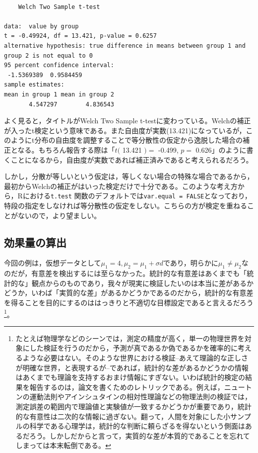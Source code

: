 \documentclass[
  a4paper,
]{ltjsbook}
\begin{document}
\begin{verbatim}

    Welch Two Sample t-test

data:  value by group
t = -0.49924, df = 13.421, p-value = 0.6257
alternative hypothesis: true difference in means between group 1 and group 2 is not equal to 0
95 percent confidence interval:
 -1.5369389  0.9584459
sample estimates:
mean in group 1 mean in group 2 
       4.547297        4.836543 
\end{verbatim}

よく見ると，タイトルがWelch Two Sample
t-testに変わっている。Welchの補正が入ったt検定という意味である。また自由度が実数(13.421)になっているが，このようにt分布の自由度を調整することで等分散性の仮定から逸脱した場合の補正となる。もちろん報告する際は「\(t(\)
13.421 \()=\) -0.499, \(p=\)
0.626」のように書くことになるから，自由度が実数であれば補正済みであると考えられるだろう。

しかし，分散が等しいという仮定は，等しくない場合の特殊な場合であるから，最初からWelchの補正がはいった検定だけで十分である。このような考え方から，Rにおける\texttt{t.test}
関数のデフォルトでは\texttt{var.equal\ =\ FALSE}となっており，特段の指定をしなければ等分散性の仮定をしない。こちらの方が検定を重ねることがないので，より望ましい。

\subsection{効果量の算出}\label{ux52b9ux679cux91cfux306eux7b97ux51fa}

今回の例は，仮想データとして\(\mu_1 = 4,\mu_2 = \mu_1 + \sigma d\)であり，明らかに\(\mu_1 \neq \mu_2\)なのだが，有意差を検出するには至らなかった。統計的な有意差はあくまでも「統計的な」観点からのものであり，我々が現実に検証したいのは本当に差があるかどうか，いわば「実質的な差」があるかどうかであるのだから，統計的な有意差を得ることを目的にするのははっきりと不適切な目標設定であると言えるだろう\footnote{たとえば物理学などのシーンでは，測定の精度が高く，単一の物理世界を対象にした検証を行うのだから，予測が真であるか偽であるかを確率的に考えるような必要はない。そのような世界における検証--あえて理論的な正しさが明確な世界，と表現するが--であれば，統計的な差があるかどうかの情報はあくまでも理論を支持するおまけ情報にすぎない。いわば統計的検定の結果を報告するのは，論文を書くためのレトリックである。例えば，ニュートンの運動法則やアインシュタインの相対性理論などの物理法則の検証では，測定誤差の範囲内で理論値と実験値が一致するかどうかが重要であり，統計的な有意性は二次的な情報に過ぎない。翻って，人間を対象にした小サンプルの科学である心理学は，統計的な判断に頼らざるを得ないという側面はあるだろう。しかしだからと言って，実質的な差が本質的であることを忘れてしまっては本末転倒である。}。
\end{document}
